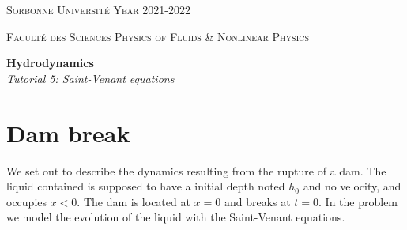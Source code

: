 \documentclass[11pt,a4paper]{article}
\begin{document}
\setlength{\unitlength}{1cm}
\noindent
\parbox{\textwidth}{
\textsc{
Sorbonne Université  
\hfill
Year 2021-2022
}
}
\parbox{\textwidth}{
\textsc{
Faculté des Sciences
\hfill
Physics of Fluids \& Nonlinear Physics
}
}

\begin{center}
\Large
\textbf{Hydrodynamics} \\ 
\textsl{Tutorial 5: Saint-Venant equations} \\[1ex]
\end{center}

\section{Dam break}
\togglefalse{corrige}

We set out to describe the dynamics resulting from the rupture of a dam. The liquid contained is supposed to have a initial depth noted $h_0$ and no velocity, and occupies $x<0$. The dam is located at $x=0$ and breaks at $t=0$. In the problem we model the evolution of the liquid with the Saint-Venant equations.
\end{document}
